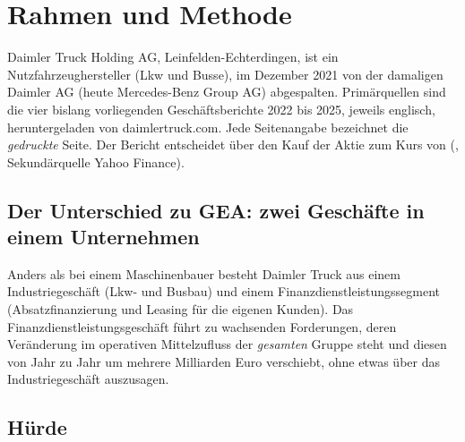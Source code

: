 \section*{Rahmen und Methode}
\label{sec:methode}

Daimler Truck Holding AG, Leinfelden-Echterdingen, ist ein Nutzfahrzeughersteller
(Lkw und Busse), im Dezember 2021 von der damaligen Daimler AG (heute Mercedes-Benz
Group AG) abgespalten. Prim\"arquellen sind die vier bislang vorliegenden
Gesch\"aftsberichte 2022 bis 2025, jeweils englisch, heruntergeladen von
daimlertruck.com. Jede Seitenangabe bezeichnet die \emph{gedruckte} Seite. Der Bericht
entscheidet \"uber den Kauf der Aktie zum Kurs von  (\KursDatum,
Sekund\"arquelle Yahoo Finance).

\subsection*{Der Unterschied zu GEA: zwei Gesch\"afte in einem Unternehmen}

Anders als bei einem Maschinenbauer besteht Daimler Truck aus einem Industriegesch\"aft
(Lkw- und Busbau) und einem Finanzdienstleistungssegment (Absatzfinanzierung und
Leasing f\"ur die eigenen Kunden). Das Finanzdienstleistungsgesch\"aft f\"uhrt zu
wachsenden Forderungen, deren Ver\"anderung im operativen Mittelzufluss der
\emph{gesamten} Gruppe steht und diesen von Jahr zu Jahr um mehrere Milliarden Euro
verschiebt, ohne etwas \"uber das Industriegesch\"aft auszusagen.



\subsection*{H\"urde}

